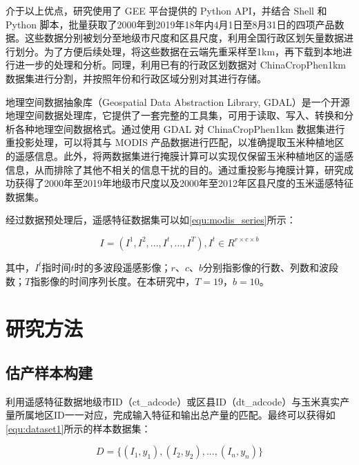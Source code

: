 \par 介于以上优点，研究使用了 GEE 平台提供的 Python API，并结合 Shell 和 Python 脚本，批量获取了2000年到2019年18年内4月1日至8月31日的四项产品数据。这些数据分别被划分至地级市尺度和区县尺度，利用全国行政区划矢量数据进行划分。为了方便后续处理，将这些数据在云端先重采样至1km，再下载到本地进行进一步的处理和分析。同理，利用已有的行政区划数据对 ChinaCropPhen1km 数据集进行分割，并按照年份和行政区域分别对其进行存储。

\par 地理空间数据抽象库\cite{warmerdam2008geospatial}（Geospatial Data Abstraction Library, GDAL）是一个开源地理空间数据处理库，它提供了一套完整的工具集，可用于读取、写入、转换和分析各种地理空间数据格式。通过使用 GDAL 对 ChinaCropPhen1km 数据集进行重投影处理，可以将其与 MODIS 产品数据进行匹配，以准确提取玉米种植地区的遥感信息。此外，将两数据集进行掩膜计算可以实现仅保留玉米种植地区的遥感信息，从而排除了其他不相关的信息干扰的目的。通过重投影与掩膜计算，研究成功获得了2000年至2019年地级市尺度以及2000年至2012年区县尺度的玉米遥感特征数据集。

\par 经过数据预处理后，遥感特征数据集可以如\autoref{equ:modis_series}所示：

\begin{equation}
    \label{equ:modis_series}
    I=(I^1, I^2, ..., I^t, ..., I^T), I^t\in R^{r\times c\times b}
\end{equation}
\par 其中，$I^t$指时间$t$时的多波段遥感影像；$r$、$c$、$b$分别指影像的行数、列数和波段数；$T$指影像的时间序列长度。在本研究中，$T=19$，$b=10$。

\section{研究方法}
\subsection{估产样本构建}

\par 利用遥感特征数据地级市ID（ct\_adcode）或区县ID（dt\_adcode）与玉米真实产量所属地区ID一一对应，完成输入特征和输出总产量的匹配。最终可以获得如\autoref{equ:dataset1}所示的样本数据集：

\begin{equation}
  \label{equ:dataset1}
  D=\{(I_1, y_1),(I_2, y_2), ..., (I_n, y_n)\}
\end{equation}

